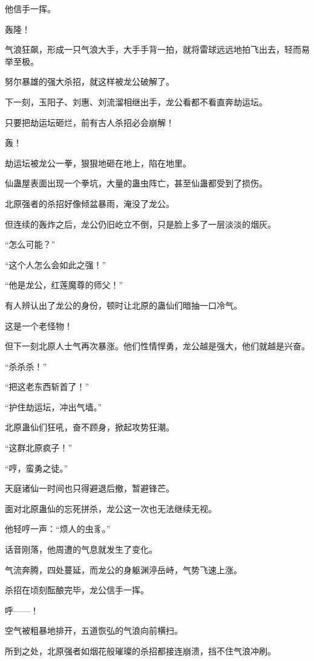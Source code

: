 \begin{this_body}
他信手一挥。

轰隆！

气浪狂飙，形成一只气浪大手，大手手背一拍，就将雷球远远地拍飞出去，轻而易举至极。

努尔暴雄的强大杀招，就这样被龙公破解了。

下一刻，玉阳子、刘惠、刘流溜相继出手，龙公看都不看直奔劫运坛。

只要把劫运坛砸烂，前有古人杀招必会崩解！

轰！

劫运坛被龙公一拳，狠狠地砸在地上，陷在地里。

仙蛊屋表面出现一个拳坑，大量的蛊虫阵亡，甚至仙蛊都受到了损伤。

北原强者的杀招好像倾盆暴雨，淹没了龙公。

但连续的轰炸之后，龙公仍旧屹立不倒，只是脸上多了一层淡淡的烟灰。

“怎么可能？”

“这个人怎么会如此之强！”

“他是龙公，红莲魔尊的师父！”

有人辨认出了龙公的身份，顿时让北原的蛊仙们暗抽一口冷气。

这是一个老怪物！

但下一刻北原人士气再次暴涨。他们性情悍勇，龙公越是强大，他们就越是兴奋。

“杀杀杀！”

“把这老东西斩首了！”

“护住劫运坛，冲出气墙。”

北原蛊仙们狂吼，奋不顾身，掀起攻势狂潮。

“这群北原疯子！”

“哼，蛮勇之徒。”

天庭诸仙一时间也只得避退后撤，暂避锋芒。

面对北原蛊仙的忘死拼杀，龙公这一次也无法继续无视。

他轻哼一声：“烦人的虫豸。”

话音刚落，他周遭的气息就发生了变化。

气流奔腾，四处蔓延，而龙公的身躯渊渟岳峙，气势飞速上涨。

杀招在顷刻酝酿完毕，龙公信手一挥。

呼——！

空气被粗暴地排开，五道恢弘的气浪向前横扫。

所到之处，北原强者如烟花般璀璨的杀招都接连崩溃，挡不住气浪冲刷。


\end{this_body}
